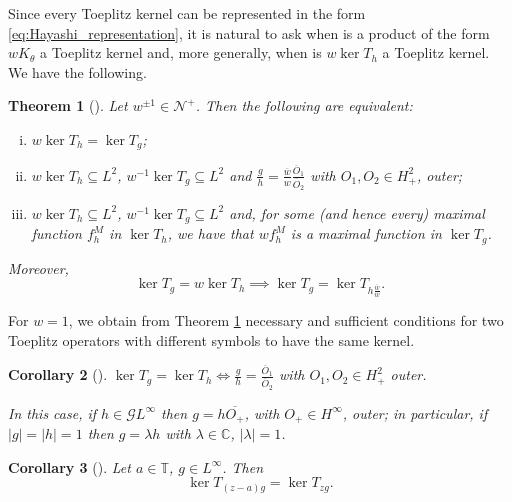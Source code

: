 \documentclass[12pt]{elsarticle}
\numberwithin{equation}{section}
\theoremstyle{plain}
\newtheorem{thm}{Theorem}[section]
\newtheorem{cor}[thm]{Corollary}
\newcommand{\Hp}{\ensuremath{H^2_+}}
\newcommand{\Linf}{\ensuremath{L^\infty}}
\newcommand{\Hinf}{\ensuremath{H^\infty}}
\newcommand{\TT}{\ensuremath{\mathbb{T}}}
\newcommand{\CC}{\ensuremath{\mathbb{C}}}
\newcommand{\GG}{\ensuremath{\mathcal{G}}}
\newcommand{\NN}{\ensuremath{\mathcal{N}^+}}
\newcommand{\ol}[1]{\ensuremath{\overline{#1}}}
\renewcommand{\subset}{\subseteq}
\begin{document}
Since every Toeplitz kernel can be represented in the form \eqref{eq:Hayashi_representation}, it is natural to ask when is a product of the form $w K_\theta$ a Toeplitz kernel and, more generally, when is $w \ker T_h$ a Toeplitz kernel.
We have the following.


\begin{thm}[{\cite{CP18_multipliers}}]
\label{thm:multiplicadores_onto_kernels}
Let $w^{\pm 1} \in \NN$.
Then the following are equivalent:
\begin{enumerate}[(i)]
\item $w \ker T_h = \ker T_g$;

\item $w \ker T_h \subset L^2$, $w^{-1} \ker T_g \subset L^2$ and $\frac{g}{h} = \frac{\ol w}{w} \frac{\ol O_1}{\ol O_2}$ with $O_1,O_2 \in \Hp$, outer;

\item $w \ker T_h \subset L^2$, $w^{-1} \ker T_g \subset L^2$ and, for some (and hence every) maximal function $f^M_h$ in $\ker T_h$, we have that $w f^M_h$ is a maximal function in $\ker T_g$.
\end{enumerate}

Moreover,
\begin{equation}
\label{eq:simbolo_vindo_de_multiplicador}
\ker T_g = w \ker T_h \implies \ker T_g = \ker T_{h\frac{\ol w}{w}}.
\end{equation}

\end{thm}


For $w=1$, we obtain from Theorem \ref{thm:multiplicadores_onto_kernels} necessary and  sufficient conditions for two Toeplitz operators with different symbols to have the same kernel.


\begin{cor}[{\cite[Corollary 2.19]{CP18_multipliers}}]
\label{cor:kernels_iguais}
$\ker T_g = \ker T_h \iff \frac{g}{h} = \frac{\ol O_1}{\ol O_2}$ with $O_1,O_2\in\Hp$ outer.

In this case, if $h\in\GG\Linf$ then $g = h \ol{O_+}$, with $O_+\in\Hinf$, outer; in particular, if $|g| = |h| = 1$ then $g=\lambda h$ with $\lambda\in\CC$, $|\lambda| =1$.

\end{cor}


\begin{cor}[{\cite[Corollary 6.3]{CP24}}]
\label{cor:symbol_zero_on_T}
Let $a\in\TT$, $g\in\Linf$. Then
\[
\ker T_{(z-a)g} = \ker T_{zg}.
\]
\end{cor}
\end{document}
